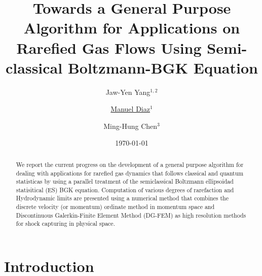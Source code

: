 \documentclass[twoside,twocolumn,prc,floats,amsmath,amssymb]{revtex4} %
\begin{document}
\fontsize{11.5}{10}
\title{Towards a General Purpose Algorithm for Applications on Rarefied Gas Flows Using Semi-classical Boltzmann-BGK Equation}
\author{ Jaw-Yen Yang$^{1,2}$ } 
\author{ \underline{Manuel Diaz$^{1}$} }
\author{ Ming-Hung Chen$^{3}$ }
\date{\today}

\begin{abstract}
We report the current progress on the development of a general purpose algorithm for dealing with applications for rarefied gas dynamics that follows classical and quantum statisticas by using a parallel treatment of the semiclassical Boltzmann ellipsoidad statisitical (ES) BGK equation. Computation of various degrees of rarefaction and Hydrodynamic limits are presented using a numerical method that combines the discrete velocity (or momentum) ordinate method in momentum space and Discontinuous Galerkin-Finite Element Method (DG-FEM) as high resolution methods for shock capturing in physical space.
\end{abstract}


\maketitle

\section{Introduction}
\end{document}
